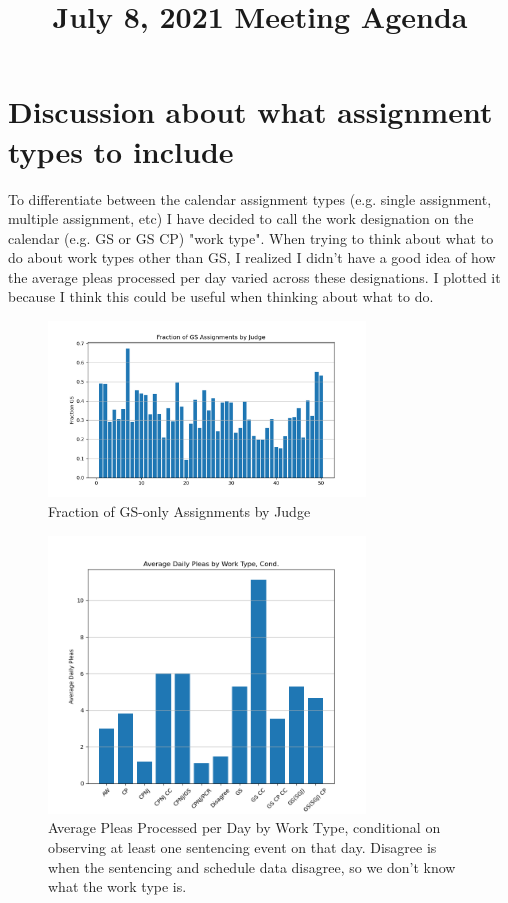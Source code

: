 \documentclass[11pt]{article}
\title{July 8, 2021 Meeting Agenda}
\begin{document}
\maketitle

\section{Discussion about what assignment types to include}
  To differentiate between the calendar assignment types (e.g. single assignment, multiple assignment, etc) I have decided to call the work designation on the calendar (e.g. GS or GS CP) "work type". When trying to think about what to do about work types other than GS, I realized I didn't have a good idea of how the average pleas processed per day varied across these designations. I plotted it because I think this could be useful when thinking about what to do.

  \begin{figure}[H]
    \centering
    \includegraphics[width=0.75\textwidth]{../../../output/figures/Exploration/fraction_gs_by_judge.png}
    \caption{Fraction of GS-only Assignments by Judge}
    \label{fig-frac-gs}
  \end{figure}

  \begin{figure}[H]
    \centering
    \includegraphics[width=0.75\textwidth]{../../../output/figures/Exploration/avg_pleas_by_worktype_cond.png}
    \caption{Average Pleas Processed per Day by Work Type, conditional on observing at least one sentencing event on that day. Disagree is when the sentencing and schedule data disagree, so we don't know what the work type is.}
    \label{fig-avg-plea-cond}
  \end{figure}
\end{document}
